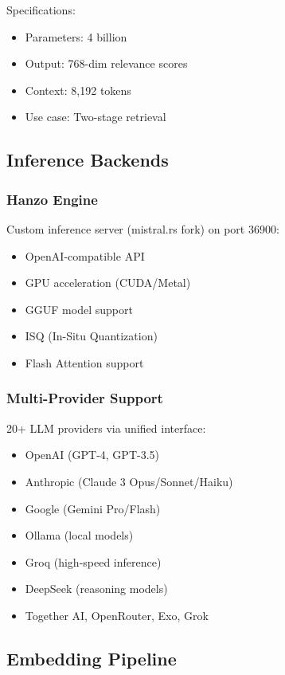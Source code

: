 \documentclass[11pt,twocolumn]{article}
\begin{document}
Specifications:
\begin{itemize}
\item Parameters: 4 billion
\item Output: 768-dim relevance scores
\item Context: 8,192 tokens
\item Use case: Two-stage retrieval
\end{itemize}

\subsection{Inference Backends}

\subsubsection{Hanzo Engine}

Custom inference server (mistral.rs fork) on port 36900:

\begin{itemize}
\item OpenAI-compatible API
\item GPU acceleration (CUDA/Metal)
\item GGUF model support
\item ISQ (In-Situ Quantization)
\item Flash Attention support
\end{itemize}

\subsubsection{Multi-Provider Support}

20+ LLM providers via unified interface:
\begin{itemize}
\item OpenAI (GPT-4, GPT-3.5)
\item Anthropic (Claude 3 Opus/Sonnet/Haiku)
\item Google (Gemini Pro/Flash)
\item Ollama (local models)
\item Groq (high-speed inference)
\item DeepSeek (reasoning models)
\item Together AI, OpenRouter, Exo, Grok
\end{itemize}

\subsection{Embedding Pipeline}
\end{document}
